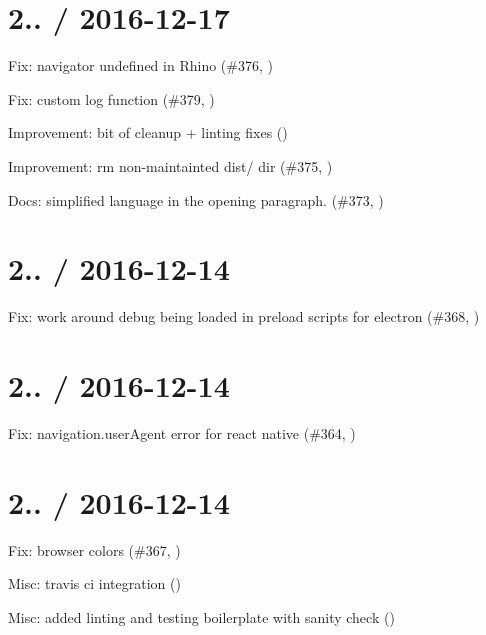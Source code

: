 \section*{2.. / 2016-\/12-\/17 }


\begin{DoxyItemize}
\item Fix\+: {\ttfamily navigator} undefined in Rhino (\#376, )
\item Fix\+: custom log function (\#379, )
\item Improvement\+: bit of cleanup + linting fixes ()
\item Improvement\+: rm non-\/maintainted {\ttfamily dist/} dir (\#375, )
\item Docs\+: simplified language in the opening paragraph. (\#373, )
\end{DoxyItemize}

\section*{2.. / 2016-\/12-\/14 }


\begin{DoxyItemize}
\item Fix\+: work around debug being loaded in preload scripts for electron (\#368, )
\end{DoxyItemize}

\section*{2.. / 2016-\/12-\/14 }


\begin{DoxyItemize}
\item Fix\+: navigation.\+user\+Agent error for react native (\#364, )
\end{DoxyItemize}

\section*{2.. / 2016-\/12-\/14 }


\begin{DoxyItemize}
\item Fix\+: browser colors (\#367, )
\item Misc\+: travis ci integration ()
\item Misc\+: added linting and testing boilerplate with sanity check ()
\end{DoxyItemize}

